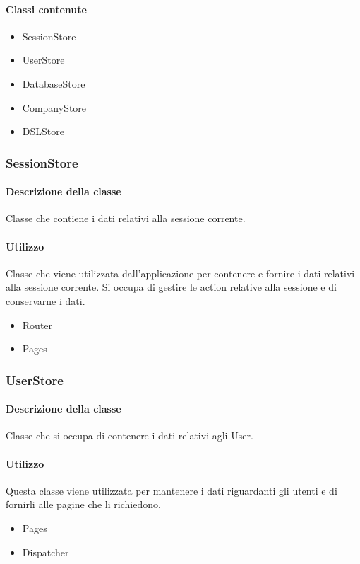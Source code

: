 \paragraph*{Classi contenute}
\begin{itemize}
\item SessionStore
\item UserStore
\item DatabaseStore
\item CompanyStore
\item DSLStore
\end{itemize}

\subsubsection{SessionStore}
\paragraph*{Descrizione della classe}
Classe che contiene i dati relativi alla sessione corrente.
\paragraph*{Utilizzo}
Classe che viene utilizzata dall'applicazione per contenere e fornire i dati relativi alla sessione corrente. Si occupa di gestire le action relative alla sessione e di conservarne i dati.
\begin{itemize}
\item Router
\item Pages
\end{itemize}

\subsubsection{UserStore}
\paragraph*{Descrizione della classe}
Classe che si occupa di contenere i dati relativi agli User.
\paragraph*{Utilizzo}
Questa classe viene utilizzata per mantenere i dati riguardanti gli utenti e di fornirli alle pagine che li richiedono.
\begin{itemize}
\item Pages
\item Dispatcher
\end{itemize}


